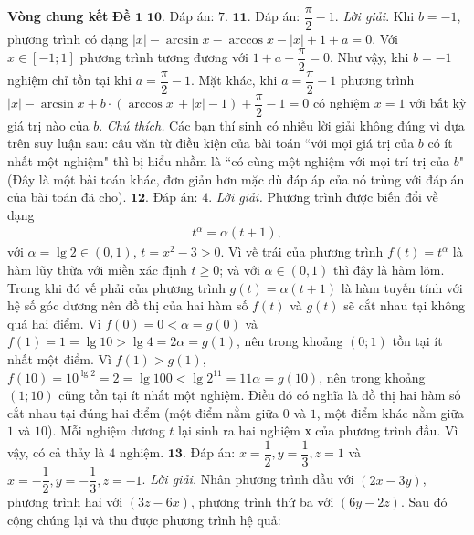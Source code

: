 \begin{multicols}{2}
	\vskip 0.1cm
	\textbf{\color{cackithi}Vòng chung kết}
	\vskip 0.1cm
	\textbf{\color{cackithi}Đề $\pmb{1}$}
	\vskip 0.1cm
	$\pmb{10.}$ Đáp án: $7$.
	\vskip 0.1cm 
	$\pmb{11.}$ Đáp án:  $\dfrac{\pi}{2} -1$.
	\vskip 0.1cm 
	\textit{Lời giải}. Khi  $b = -1$, phương trình có dạng $|x| - \arcsin x - \arccos x - |x| + 1 + a = 0$. Với $x \in [-1;1]$ phương trình tương đương với $1 + a - \dfrac{\pi}{2} = 0$. Như vậy, khi $b = -1$  nghiệm chỉ tồn tại khi $a = \dfrac{\pi}{2} - 1$.
	\vskip 0.1cm
	Mặt khác, khi $a = \dfrac{\pi}{2} -1$ phương trình $|x| - \arcsin x + b \cdot (\arccos x\, + |x| - 1) + \dfrac{\pi }{2} - 1 = 0$ có nghiệm $x =1$ với bất kỳ giá trị nào của $b$.
	\vskip 0.1cm
	\textit{Chú thích.} Các bạn thí sinh có nhiều lời giải không đúng vì dựa trên suy luận sau: câu văn từ điều kiện của bài toán ``với mọi giá trị của $b$ có ít nhất một nghiệm" thì bị hiểu nhầm là ``có cùng một nghiệm với mọi trí trị của $b$" (Đây là một bài toán khác, đơn giản hơn mặc dù đáp áp của nó trùng với đáp án của bài toán đã cho). 
	\vskip 0.1cm
	$\pmb{12.}$ Đáp án: $4$.
	\vskip 0.1cm 
	\textit{Lời giải.} Phương trình được biến đổi về dạng 
	\begin{align*}
		{t^\alpha } = \alpha (t + 1),
	\end{align*}
	với $\alpha  = \lg 2 \in (0,1)$, $t = {x^2} - 3 > 0$.
	\vskip 0.1cm
	Vì vế trái của phương trình $f\left( t \right) = {t^\alpha }$ là hàm lũy thừa với miền xác định $t \ge 0$; và với $\alpha \in  (0,1)$ thì đây là hàm lõm. Trong khi đó vế phải của phương trình $g(t) = \alpha(t+1)$ là hàm tuyến tính với hệ số góc dương nên đồ thị của hai hàm số $f(t)$ và $g(t)$ sẽ cắt nhau tại không quá hai điểm.
	\vskip 0.1cm
	Vì $f\left( 0 \right) = 0 < \alpha  = g\left( 0 \right)$ và  $f\left( 1 \right) = 1 = \lg 10 > \lg 4 = 2\alpha  = g\left( 1 \right)$, nên trong khoảng $(0;1)$ tồn tại ít nhất một điểm.
	\vskip 0.1cm
	Vì $f(1) > g(1)$, $f\left( {10} \right) = {10^{\lg 2}} = 2 = \lg 100 < \lg {2^{11}} = 11\alpha  = g\left( {10} \right)$, nên trong khoảng $(1;10)$ cũng tồn tại ít nhất một nghiệm.
	\vskip 0.1cm
	Điều đó có nghĩa là đồ thị hai hàm số cắt nhau tại đúng hai điểm (một điểm nằm giữa $0$ và $1$, một điểm khác nằm giữa $1$ và $10$).
	\vskip 0.1cm 
	Mỗi nghiệm dương $t$ lại sinh ra hai nghiệm $х$ của phương trình đầu. Vì vậy, có cả thảy là $4$ nghiệm.
	\vskip 0.1cm
	$\pmb{13.}$ Đáp án:  $x = \dfrac{1}{2}, y = \dfrac{1}{3}, z= 1$  và  $x = -\dfrac{1}{2}, y = - \dfrac{1}{3}  , z= -1$.
	\vskip 0.1cm 
	\textit{Lời giải.} Nhân phương trình đầu với  $(2x - 3y)$, phương trình hai với $(3z-6x)$, phương trình thứ ba với $(6y-2z)$. Sau đó cộng chúng lại và thu được phương trình hệ quả:

\end{multicols}
